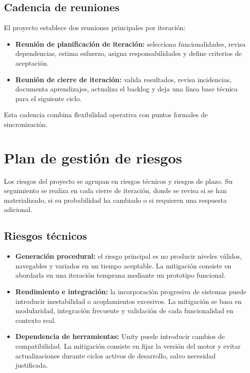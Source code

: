 \subsection{Cadencia de reuniones}
El proyecto establece dos reuniones principales por iteración:

\begin{itemize}
    \item \textbf{Reunión de planificación de iteración:} selecciona funcionalidades,
    revisa dependencias, estima esfuerzo, asigna responsabilidades y define criterios de
    aceptación.
    \item \textbf{Reunión de cierre de iteración:} valida resultados, revisa incidencias,
    documenta aprendizajes, actualiza el backlog y deja una línea base técnica para el
    siguiente ciclo.
\end{itemize}

Esta cadencia combina flexibilidad operativa con puntos formales de sincronización.

\section{Plan de gestión de riesgos}
Los riesgos del proyecto se agrupan en riesgos técnicos y riesgos de plazo. Su seguimiento
se realiza en cada cierre de iteración, donde se revisa si se han materializado, si su
probabilidad ha cambiado o si requieren una respuesta adicional.

\subsection{Riesgos técnicos}
\begin{itemize}
    \item \textbf{Generación procedural:} el riesgo principal es no producir niveles válidos,
    navegables y variados en un tiempo aceptable. La mitigación consiste en abordarla en una
    iteración temprana mediante un prototipo funcional.
    \item \textbf{Rendimiento e integración:} la incorporación progresiva de sistemas puede
    introducir inestabilidad o acoplamientos excesivos. La mitigación se basa en modularidad,
    integración frecuente y validación de cada funcionalidad en contexto real.
    \item \textbf{Dependencia de herramientas:} Unity puede introducir cambios de
    compatibilidad. La mitigación consiste en fijar la versión del motor y evitar
    actualizaciones durante ciclos activos de desarrollo, salvo necesidad justificada.
\end{itemize}

